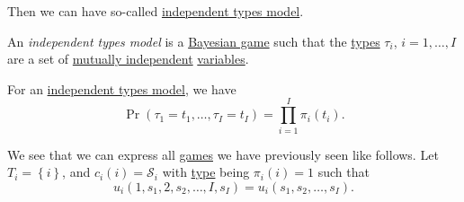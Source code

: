 Then we can have so-called \hyperref[def:independent-types-model]{independent types model}.
\begin{definition}\label{def:independent-types-model}
	An \emph{independent types model} is a \hyperref[def:mathematical-Bayesian-game]{Bayesian game} such that the \hyperref[def:type]{types} \(\tau _i\),
	\(i = 1, \dots  , I\) are a set of \hyperref[def:independent]{mutually independent} \hyperref[def:random-variable]{variables}.
\end{definition}

\begin{remark}
	For an \hyperref[def:independent-types-model]{independent types model}, we have
	\[
		\Pr(\tau_{1} = t_1, \dots , \tau_{I} = t_{I})=\prod\limits_{i = 1}^{I} \pi_{i}(t_{i}).
	\]
\end{remark}

We see that we can express all \hyperref[def:mathematical-game]{games} we have previously seen like follows. Let \(T_{i} = \left\{i\right\}\), and
\(c_{i}(i) = \mathcal{S}_{i}\) with \hyperref[def:type]{type} being \(\pi_i(i) = 1\) such that
\[
	u_{i}(1, s_1, 2, s_2, \dots , I, s_I) = u_{i}(s_1, s_2, \dots , s_I).
\]

